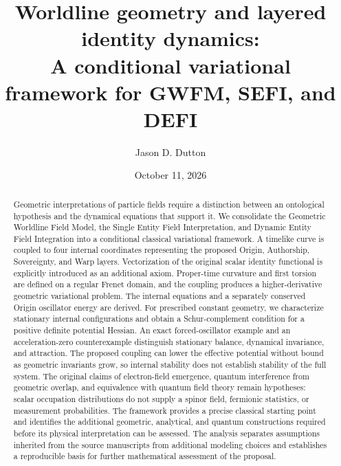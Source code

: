 \documentclass[aip,jmp,reprint,onecolumn,amsmath,amssymb]{revtex4-2}
\begin{document}
\title{Worldline geometry and layered identity dynamics:\\A conditional variational framework for GWFM, SEFI, and DEFI}
\author{Jason D. Dutton}
\date{October 11, 2026}
\begin{abstract}
Geometric interpretations of particle fields require a distinction between an ontological hypothesis and the dynamical equations that support it. We consolidate the Geometric Worldline Field Model, the Single Entity Field Interpretation, and Dynamic Entity Field Integration into a conditional classical variational framework. A timelike curve is coupled to four internal coordinates representing the proposed Origin, Authorship, Sovereignty, and Warp layers. Vectorization of the original scalar identity functional is explicitly introduced as an additional axiom. Proper-time curvature and first torsion are defined on a regular Frenet domain, and the coupling produces a higher-derivative geometric variational problem. The internal equations and a separately conserved Origin oscillator energy are derived. For prescribed constant geometry, we characterize stationary internal configurations and obtain a Schur-complement condition for a positive definite potential Hessian. An exact forced-oscillator example and an acceleration-zero counterexample distinguish stationary balance, dynamical invariance, and attraction. The proposed coupling can lower the effective potential without bound as geometric invariants grow, so internal stability does not establish stability of the full system. The original claims of electron-field emergence, quantum interference from geometric overlap, and equivalence with quantum field theory remain hypotheses: scalar occupation distributions do not supply a spinor field, fermionic statistics, or measurement probabilities. The framework provides a precise classical starting point and identifies the additional geometric, analytical, and quantum constructions required before its physical interpretation can be assessed. The analysis separates assumptions inherited from the source manuscripts from additional modeling choices and establishes a reproducible basis for further mathematical assessment of the proposal.
\end{abstract}
\maketitle
\end{document}
